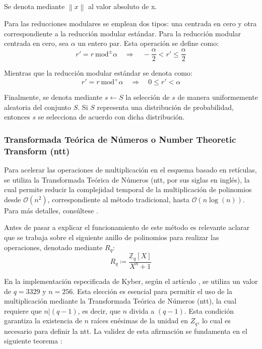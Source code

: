 Se denota mediante $\left\| x\right\|$ al valor absoluto de x.
\newline

Para las reducciones modulares se emplean dos tipos: una centrada en cero y otra correspondiente a la reducción modular estándar. Para la reducción modular centrada en cero, sea \(\alpha\) un entero par. Esta operación se define como:
\begin{equation}
	r' = r \ \text{mod}^{\pm} \alpha \quad \Longrightarrow \quad -\dfrac{\alpha}{2} < r' \le \dfrac{\alpha}{2}
\end{equation}

Mientras que la reducción modular estándar se denota como:
\begin{equation}
	r' = r \ \text{mod}^{+} \alpha \quad \Longrightarrow \quad 0 \le r' < \alpha
\end{equation}

Finalmente, se denota mediante \(s \leftarrow S\) la selección de \(s\) de manera uniformemente aleatoria del conjunto \(S\). Si \(S\) representa una distribución de probabilidad, entonces \(s\) se selecciona de acuerdo con dicha distribución.
\newpage

\subsubsection{Transformada Teórica de Números o Number Theoretic Transform (\gls{ntt})}
Para acelerar las operaciones de multiplicación en el esquema basado en retículas, se utiliza la Transformada Teórica de Números (\gls{ntt}, por sus siglas en inglés), la cual permite reducir la complejidad temporal de la multiplicación de polinomios desde \(\mathcal{O}(n^2)\), correspondiente al método tradicional, hasta \(\mathcal{O}(n \log(n))\). Para más detalles, consúltese \cite{cryptoeprint:2024/585}.
\newline

Antes de pasar a explicar el funcionamiento de este método es relevante aclarar que se trabaja sobre el siguiente anillo de polinomios para realizar las operaciones, denotado mediante \(R_q\):
\begin{equation}
	R_q \coloneqq \dfrac{\mathbb{Z}_q[X]}{X^n + 1}
\end{equation}

En la implementación especificada de Kyber, según el artículo \cite{kyber-spec-2021}, se utiliza un valor de \(q=3329\) y \(n=256\). Esta elección es esencial para permitir el uso de la multiplicación mediante la Transformada Teórica de Números (\gls{ntt}), la cual requiere que \(n| (q-1)\), es decir, que \(n\) divida a \((q-1)\). Esta condición garantiza la existencia de \(n\) raíces enésimas de la unidad en \(Z_q\), lo cual es necesario para definir la \gls{ntt}. La validez de esta afirmación se fundamenta en el siguiente teorema \cite{moreno-roots}:
\newline

